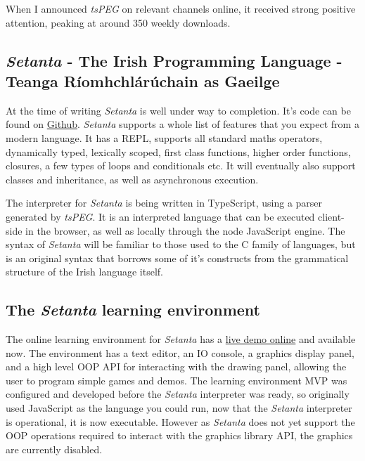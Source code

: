 \documentclass[11pt]{extarticle}
\newcommand{\Setanta}{\emph{Setanta}}
\newcommand{\tsPEG}{\emph{tsPEG}}
\begin{document}
            When I announced \tsPEG{} on relevant channels online, it received strong positive attention, peaking at around 350 weekly downloads.

        \subsection{\Setanta{} - The Irish Programming Language - Teanga R\'iomhchl\'ar\'uchain as Gaeilge}

            At the time of writing \Setanta{} is well under way to completion. It's code can be found on \href{https://github.com/EoinDavey/Setanta}{Github}. \Setanta{} supports a whole list of features that you expect from a modern language. It has a REPL, supports all standard maths operators, dynamically typed, lexically scoped, first class functions, higher order functions, closures, a few types of loops and conditionals etc. It will eventually also support classes and inheritance, as well as asynchronous execution.

            The interpreter for \Setanta{} is being written in TypeScript, using a parser generated by \tsPEG{}.
            It is an interpreted language that can be executed client-side in the browser, as well as locally through the node JavaScript engine.
            The syntax of \Setanta{} will be familiar to those used to the C family of languages, but is an original syntax that borrows some of it's constructs from the grammatical structure of the Irish language itself.

        \subsection{The \Setanta{} learning environment}

        The online learning environment for \Setanta{} has a \href{https://vey.ie/goto?go=fyp}{live demo online} and available now. The environment has a text editor, an IO console, a graphics display panel, and a high level OOP API for interacting with the drawing panel, allowing the user to program simple games and demos.
        The learning environment MVP was configured and developed before the \Setanta{} interpreter was ready, so originally used JavaScript as the language you could run, now that the \Setanta{} interpreter is operational, it is now executable. However as \Setanta{} does not yet support the OOP operations required to interact with the graphics library API, the graphics are currently disabled.
\end{document}
